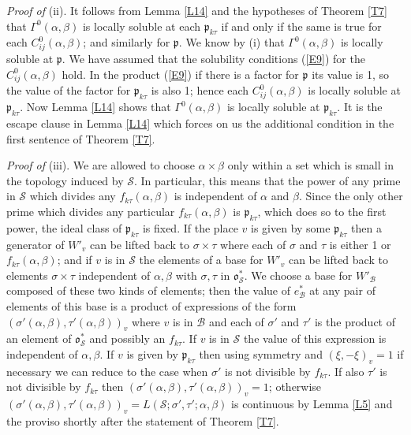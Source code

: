 \documentclass[12pt]{article}
\def\fo{{\mathfrak o}}
\def\fp{{\mathfrak p}}
\def\ga{{\alpha}}
\def\gb{{\beta}}
\def\gG{{\Gamma}}
\def\gs{{\sigma}}
\def\sB{{\mathcal B}}
\def\sS{{\mathcal S}}
\begin{document}
\medskip

\noindent \emph{Proof of} (ii). It follows from Lemma \ref{L14} and the
hypotheses of Theorem \ref{T7} that $\gG^0(\ga,\gb)$ is locally soluble at
each $\fp_{k\tau}$ if and only if the same is true for each $C^0_{ij}
(\ga,\gb)$;
and similarly for $\fp$. We know by (i) that
$\gG^0(\ga,\gb)$ is locally soluble at $\fp$. We have
assumed that the
solubility conditions (\ref{E9}) for the $C^0_{ij}(\ga,\gb)$ hold. In the
product (\ref{E9}) if there is a  factor for $\fp$ its value
is 1, so the value of the factor for
$\fp_{k\tau}$ is also 1; hence each $C^0_{ij}(\ga,\gb)$ is locally soluble
at $\fp_{k\tau}$. Now Lemma \ref{L14} shows that $\gG^0(\ga,\gb)$ is
locally soluble at $\fp_{k\tau}$. It is the escape clause in Lemma \ref{L14}
which forces on us the additional condition in the first sentence of Theorem
\ref{T7}.

\medskip

\noindent \emph{Proof of} (iii). We are allowed to choose
$\ga\times\gb$ only
within a set which is small in the topology
induced by $\sS$. In particular, this means that the power of
any prime in $\sS$ which divides any $f_{k\tau}(\ga,\gb)$ is
independent of $\ga$ and $\gb$. Since the only other prime
which divides any particular $f_{k\tau}(\ga,\gb)$ is
$\fp_{k\tau}$,
which does so to the first power, the ideal class of
$\fp_{k\tau}$ is fixed. If the place $v$ is given by some
$\fp_{k\tau}$ then a generator of $W'_v$ can be lifted back to
$\gs\times\tau$ where each of $\gs$ and $\tau$ is either 1
or $f_{k\tau}(\ga,\gb)$; and if $v$ is in $\sS$ the elements of
a base for $W'_v$ can be lifted back to elements
$\gs\times\tau$ independent of $\ga,\gb$ with $\gs,\tau$ in
$\fo^*_\sS$. We choose a base for $W'_\sB$ composed of these
two kinds of elements; then the value of $e^*_\sB$ at any pair
of elements of this base is a product of expressions of the
form $(\gs'(\ga,\gb),\tau'(\ga,\gb))_v$ where $v$ is in $\sB$
and each of $\gs'$
and $\tau'$ is the product of an element of $\fo^*_\sS$ and
possibly an $f_{k\tau}$. If $v$ is in $\sS$ the value
of this expression is independent of $\ga,\gb$. If $v$ is
given by $\fp_{k\tau}$ then using symmetry and 
$(\xi,-\xi)_v=1$ if necessary we can reduce to the case when
$\gs'$ is not divisible by $f_{k\tau}$. If also $\tau'$ is not
divisible by $f_{k\tau}$ then $(\gs'(\ga,\gb),
\tau'(\ga,\gb))_v=1$; otherwise
$(\gs'(\ga,\gb),\tau'(\ga,\gb))_v=L(\sS;\gs',\tau';\ga,\gb)$
is continuous by Lemma \ref{L5} and the proviso shortly after
the statement of Theorem \ref{T7}.
\end{document}
